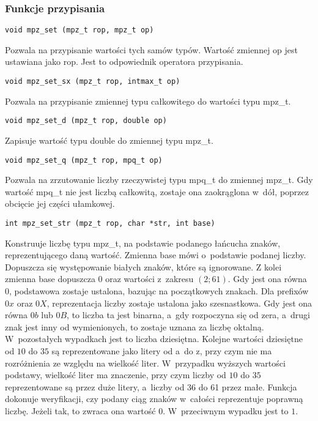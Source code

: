 \subsubsection{Funkcje przypisania}

\begin{lstlisting}
void mpz_set (mpz_t rop, mpz_t op)
\end{lstlisting}

Pozwala na przypisanie wartości tych samów typów. Wartość zmiennej op jest ustawiana jako rop. Jest to odpowiednik operatora przypisania.

\begin{lstlisting}
void mpz_set_sx (mpz_t rop, intmax_t op)
\end{lstlisting}

Pozwala na przypisanie zmiennej typu całkowitego do wartości typu mpz\_t.

\begin{lstlisting}
void mpz_set_d (mpz_t rop, double op)
\end{lstlisting}

Zapisuje wartość typu double do zmiennej typu mpz\_t.

\begin{lstlisting}
void mpz_set_q (mpz_t rop, mpq_t op)
\end{lstlisting}

Pozwala na zrzutowanie liczby rzeczywistej typu mpq\_t do zmiennej mpz\_t. Gdy wartość mpq\_t nie jest liczbą całkowitą, zostaje ona zaokrąglona w~dół, poprzez obcięcie jej części ułamkowej.

\begin{lstlisting}
int mpz_set_str (mpz_t rop, char *str, int base)
\end{lstlisting}

Konstruuje liczbę typu mpz\_t, na podstawie podanego łańcucha znaków, reprezentującego daną wartość. Zmienna base mówi o~podstawie podanej liczby. Dopuszcza się występowanie białych znaków, które są ignorowane. Z kolei zmienna base dopuszcza $0$ oraz wartości z~zakresu $(2;61)$. Gdy jest ona równa $0$, podstawowa zostaje ustalona, bazując na początkowych znakach. Dla prefixów $0x$ oraz $0X$, reprezentacja liczby zostaje ustalona jako szesnastkowa. Gdy jest ona równa $0b$ lub $0B$, to liczba ta jest binarna, a~gdy rozpoczyna się od zera, a~drugi znak jest inny od wymienionych, to zostaje uznana za liczbę oktalną. W~pozostałych wypadkach jest to liczba dziesiętna. Kolejne wartości dziesiętne od $10$ do $35$ są reprezentowane jako litery od a~do z, przy czym nie ma rozróżnienia ze względu na wielkość liter. W~przypadku wyższych wartości podstawy, wielkość liter ma znaczenie, przy czym liczby od $10$ do $35$ reprezentowane są przez duże litery, a~liczby od 36 do 61 przez małe. Funkcja dokonuje weryfikacji, czy podany ciąg znaków w~całości reprezentuje poprawną liczbę. Jeżeli tak, to zwraca ona wartość $0$. W~przeciwnym wypadku jest to $1$.

